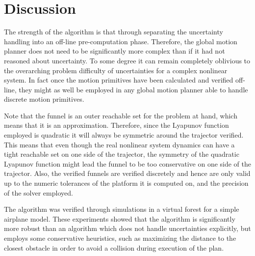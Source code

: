 \chapter{Discussion}
\label{chp:discussion}

The strength of the algorithm is that through separating the uncertainty
handling into an off-line pre-computation phase. Therefore, the global motion
planner does not need to be significantly more complex than if it had not
reasoned about uncertainty. To some degree it can remain completely oblivious to
the overarching problem difficulty of uncertainties for a complex nonlinear
system. In fact once the motion primitives have been calculated and verified
off-line, they might as well be employed in any global motion planner able to
handle discrete motion primitives.


Note that the funnel is an outer reachable set for the problem at hand, which
means that it is an approximation. Therefore, since the Lyapunov function
employed is quadratic it will always be symmetric around the trajector verified.
This means that even though the real nonlinear system dynamics can have a tight
reachable set on one side of the trajector, the symmetry of the quadratic
Lyapunov function might lead the funnel to be too conservative on one side of
the trajector. Also, the verified funnels are verified discretely and hence are
only valid up to the numeric tolerances of the platform it is computed on, and
the precision of the solver employed.


The algorithm was verified through simulations in a virtual forest for a simple
airplane model. These experiments showed that the \rrtfunnel{} algorithm is
significantly more robust than an algorithm which does not handle uncertainties
explicitly, but employs some conservative heuristics, such as maximizing the
distance to the closest obstacle in order to avoid a collision during execution
of the plan.


